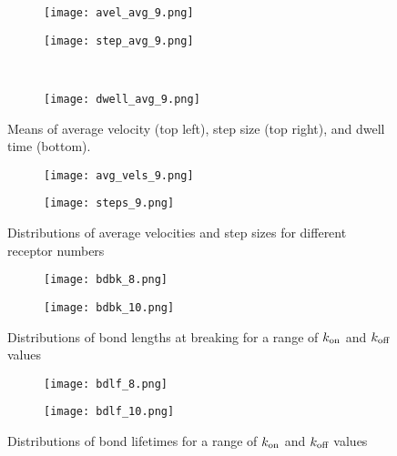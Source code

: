 \documentclass{article}
\newcommand{\tn}{\textnormal}
\begin{document}
\begin{figure}[h]
  \centering
  \begin{subfigure}{0.49\textwidth}
    \texttt{[image: avel\_avg\_9.png]}
  \end{subfigure}
  \hfill
  \begin{subfigure}{0.49\textwidth}
    \texttt{[image: step\_avg\_9.png]}
  \end{subfigure}
  \\
  \begin{subfigure}{0.49\textwidth}
    \texttt{[image: dwell\_avg\_9.png]}
  \end{subfigure}
  \label{fig:stats9}
  \caption{Means of average velocity (top left), step size (top
    right), and dwell time (bottom).}
\end{figure}

\begin{figure}[h]
  \centering
  \begin{subfigure}{0.49\textwidth}
    \texttt{[image: avg\_vels\_9.png]}
  \end{subfigure}
  \hfill
  \begin{subfigure}{0.49\textwidth}
    \texttt{[image: steps\_9.png]}
  \end{subfigure}
  \caption{Distributions of average velocities and step sizes for
    different receptor numbers}
  \label{fig:avg-vels9}
\end{figure}

\begin{figure}[h]
  \centering
  \begin{subfigure}{0.49\textwidth}
    \texttt{[image: bdbk\_8.png]}
  \end{subfigure}
  \hfill
  \begin{subfigure}{0.49\textwidth}
    \texttt{[image: bdbk\_10.png]}
  \end{subfigure}
  \caption{Distributions of bond lengths at breaking for a range of
    $k_\tn{on}$ and $k_\tn{off}$ values}
  \label{fig:bdbk}
\end{figure}

\begin{figure}[h]
  \centering
  \begin{subfigure}{0.49\textwidth}
    \texttt{[image: bdlf\_8.png]}
  \end{subfigure}
  \hfill
  \begin{subfigure}{0.49\textwidth}
    \texttt{[image: bdlf\_10.png]}
  \end{subfigure}
  \caption{Distributions of bond lifetimes for a range of $k_\tn{on}$
    and $k_\tn{off}$ values}
  \label{fig:bdlf}
\end{figure}

% 
% 
\end{document}
